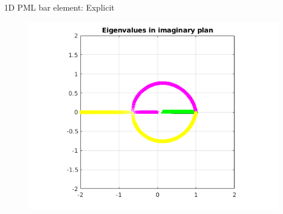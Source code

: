 \begin{frame}{1D PML bar element: Explicit}
\begin{figure}[ht] 
  \label{ fig7} 
  \begin{minipage}[b]{0.5\linewidth}
    \centering
    \includegraphics[scale=.35]{images/pml1d-exp-1.png} \\


\end{minipage}
\end{figure}
\end{frame}
